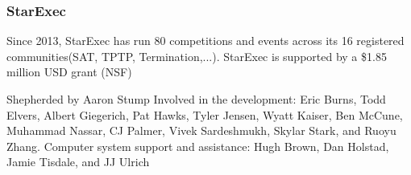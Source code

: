 \documentclass[table]{beamer}
\begin{document}

\begin{frame}
    \frametitle{StarExec}
    Since 2013, StarExec has run 80 competitions and events across its 16 registered communities(SAT, TPTP, Termination,...).
    StarExec is supported by a \$1.85 million USD grant (NSF)

\vfill
Shepherded by Aaron Stump
\vfill
Involved in the development: {\small Eric Burns, Todd Elvers,
Albert Giegerich, Pat Hawks, Tyler Jensen, Wyatt Kaiser, Ben McCune, Muhammad
Nassar, CJ Palmer, Vivek Sardeshmukh, Skylar Stark, and Ruoyu Zhang.}
\vfill
Computer system support and assistance: {\small Hugh Brown, Dan Holstad, Jamie
Tisdale, and JJ Ulrich}

\end{frame}
\end{document}
